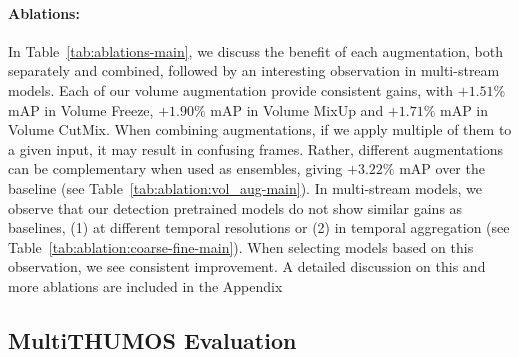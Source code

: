 \documentclass[letterpaper]{article} \usepackage{aaai23}  \usepackage{times}  \usepackage{helvet}  \usepackage{courier}  \usepackage[hyphens]{url}  \usepackage{graphicx} \urlstyle{rm} \def\UrlFont{\rm}  \usepackage{natbib}  \usepackage{caption} \frenchspacing  \setlength{\pdfpagewidth}{8.5in}  \setlength{\pdfpageheight}{11in}  \usepackage{algorithm}
\newcommand{\tref}[1]{Table~\ref{#1}}
\begin{document}
\paragraph{Ablations:} In \tref{tab:ablations-main}, we discuss the benefit of each augmentation, both separately and combined, followed by an interesting observation in multi-stream models. Each of our volume augmentation provide consistent gains, with $+1.51\%$ mAP in Volume Freeze, $+1.90\%$ mAP in Volume MixUp and $+1.71\%$ mAP in Volume CutMix. When combining augmentations, if we apply multiple of them to a given input, it may result in confusing frames. Rather, different augmentations can be complementary when used as ensembles, giving $+3.22\%$ mAP over the baseline (see \tref{tab:ablation:vol_aug-main}). In multi-stream models, we observe that our detection pretrained models do not show similar gains as baselines, (1) at different temporal resolutions or (2) in temporal aggregation (see \tref{tab:ablation:coarse-fine-main}). When selecting models based on this observation, we see consistent improvement. A detailed discussion on this and more ablations are included in the Appendix

\subsection{MultiTHUMOS Evaluation}
\label{subsec:multithumos}
\end{document}
